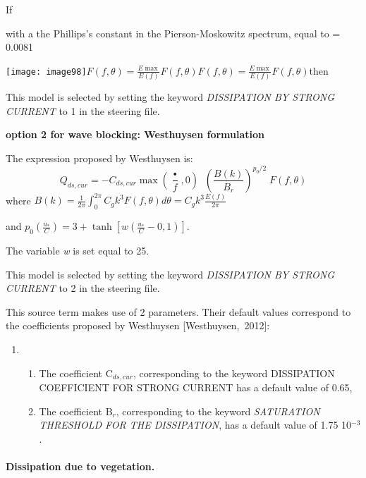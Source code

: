  If

 with a the Phillips's constant in the Pierson-Moskowitz spectrum, equal to = 0.0081

 \texttt{[image: image98]}$F(f,\theta )=\frac{E\max }{E(f)} F(f,\theta )$$F(f,\theta )=\frac{E\max }{E(f)} F(f,\theta )$then



 This model is selected by setting the keyword \textit{DISSIPATION BY STRONG CURRENT }to 1 in the steering file.\textbf{}


{\bf  option 2 for wave blocking: Westhuysen formulation }



 The expression proposed by Westhuysen is:
\[Q_{ds,cur} =-C_{ds,cur} \max \left(\frac{\mathop{f_{r} }\limits^{\bullet } }{f} ,0\right)\; \; \left(\frac{B(k)}{B_{r} } \right)^{p_{0} /2} \; F(f,\theta )\]
where $B(k)=\frac{1}{2\pi } \int _{0}^{2\pi }C_{g} k^{3} F(f,\theta )d\theta  =C_{g} k^{3} \frac{E(f)}{2\pi } $

 and $p_{0} \left(\frac{u_{*} }{C} \right)=3+\tanh \left[w\left(\frac{u_{*} }{C} -0,1\right)\right]$.

 The variable \textit{w} is set equal to 25.



 This model is selected by setting the keyword \textit{DISSIPATION BY STRONG CURRENT} to 2 in the steering file.\textbf{}

 This source term makes use of 2 parameters. Their default values correspond to the coefficients proposed by Westhuysen [Westhuysen,~2012]:

\begin{enumerate}
\item \begin{enumerate}
\item  The coefficient C${}_{ds,cur}$, corresponding to the keyword DISSIPATION COEFFICIENT FOR STRONG CURRENT has a default value of 0.65,

\item  The coefficient B${}_{r}$, corresponding to the keyword \textit{SATURATION THRESHOLD FOR THE DISSIPATION}, has a default value of 1.75 10${}^{-3}$.
\end{enumerate}
\end{enumerate}


\paragraph{ Dissipation due to vegetation.  }

